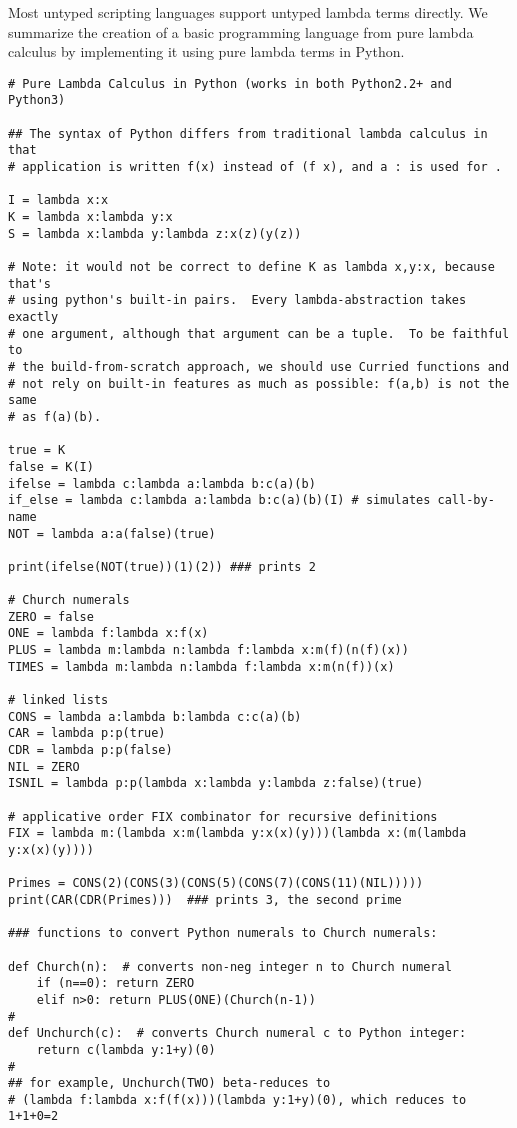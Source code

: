 Most untyped scripting languages support untyped lambda terms directly. We
summarize the creation of a basic programming language from pure lambda
calculus by implementing it using pure lambda terms in Python.
\begin{verbatim}
# Pure Lambda Calculus in Python (works in both Python2.2+ and Python3)

## The syntax of Python differs from traditional lambda calculus in that
# application is written f(x) instead of (f x), and a : is used for .

I = lambda x:x
K = lambda x:lambda y:x
S = lambda x:lambda y:lambda z:x(z)(y(z))

# Note: it would not be correct to define K as lambda x,y:x, because that's
# using python's built-in pairs.  Every lambda-abstraction takes exactly
# one argument, although that argument can be a tuple.  To be faithful to
# the build-from-scratch approach, we should use Curried functions and
# not rely on built-in features as much as possible: f(a,b) is not the same
# as f(a)(b).

true = K
false = K(I)
ifelse = lambda c:lambda a:lambda b:c(a)(b)
if_else = lambda c:lambda a:lambda b:c(a)(b)(I) # simulates call-by-name
NOT = lambda a:a(false)(true)

print(ifelse(NOT(true))(1)(2)) ### prints 2

# Church numerals 
ZERO = false
ONE = lambda f:lambda x:f(x)
PLUS = lambda m:lambda n:lambda f:lambda x:m(f)(n(f)(x))
TIMES = lambda m:lambda n:lambda f:lambda x:m(n(f))(x)

# linked lists
CONS = lambda a:lambda b:lambda c:c(a)(b)
CAR = lambda p:p(true)
CDR = lambda p:p(false)
NIL = ZERO
ISNIL = lambda p:p(lambda x:lambda y:lambda z:false)(true)

# applicative order FIX combinator for recursive definitions
FIX = lambda m:(lambda x:m(lambda y:x(x)(y)))(lambda x:(m(lambda y:x(x)(y))))

Primes = CONS(2)(CONS(3)(CONS(5)(CONS(7)(CONS(11)(NIL)))))
print(CAR(CDR(Primes)))  ### prints 3, the second prime

### functions to convert Python numerals to Church numerals:

def Church(n):  # converts non-neg integer n to Church numeral
    if (n==0): return ZERO
    elif n>0: return PLUS(ONE)(Church(n-1))
#
def Unchurch(c):  # converts Church numeral c to Python integer:
    return c(lambda y:1+y)(0)
#
## for example, Unchurch(TWO) beta-reduces to
# (lambda f:lambda x:f(f(x)))(lambda y:1+y)(0), which reduces to 1+1+0=2


\end{verbatim}
